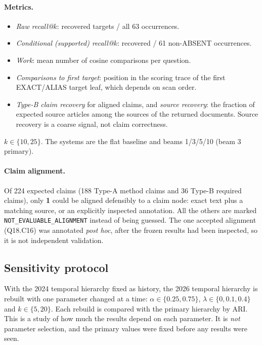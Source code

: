 \documentclass[11pt,a4paper]{article}
\theoremstyle{remark}
\newcommand{\code}[1]{\texttt{\small #1}}
\begin{document}
\paragraph{Metrics.}
\begin{itemize}
  \item \emph{Raw recall@$k$}: recovered targets / all 63 occurrences.
  \item \emph{Conditional (supported) recall@$k$}: recovered / 61 non-ABSENT occurrences.
  \item \emph{Work}: mean number of cosine comparisons per question.
  \item \emph{Comparisons to first target}: position in the scoring trace of the first
        EXACT/ALIAS target leaf, which depends on scan order.
  \item \emph{Type-B claim recovery} for aligned claims, and \emph{source recovery}: the
        fraction of expected source articles among the sources of the returned documents.
        Source recovery is a coarse signal, not claim correctness.
\end{itemize}
$k\in\{10,25\}$. The systems are the flat baseline and beams 1/3/5/10 (beam 3 primary).

\paragraph{Claim alignment.}
Of 224 expected claims (188 Type-A method claims and 36 Type-B required claims), only
\textbf{1} could be aligned defensibly to a claim node: exact text plus a matching source,
or an explicitly inspected annotation. All the others are marked
\code{NOT\_EVALUABLE\_ALIGNMENT} instead of being guessed. The one accepted alignment
(Q18.C16) was annotated \emph{post hoc}, after the frozen results had been inspected, so it
is not independent validation.

\subsection{Sensitivity protocol}
\label{sec:sens-protocol}

With the 2024 temporal hierarchy fixed as history, the 2026 temporal hierarchy is rebuilt
with one parameter changed at a time: $\alpha\in\{0.25,0.75\}$, $\lambda\in\{0,0.1,0.4\}$ and
$k\in\{5,20\}$. Each rebuild is compared with the primary hierarchy by ARI. This is a study
of how much the results depend on each parameter. It is \emph{not} parameter selection, and
the primary values were fixed before any results were seen.
\end{document}
